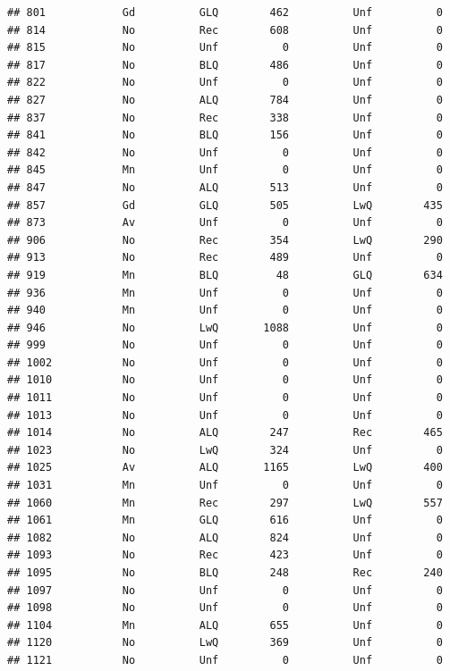 \documentclass[]{article}
\begin{document}
\begin{verbatim}
## 801            Gd          GLQ        462          Unf          0
## 814            No          Rec        608          Unf          0
## 815            No          Unf          0          Unf          0
## 817            No          BLQ        486          Unf          0
## 822            No          Unf          0          Unf          0
## 827            No          ALQ        784          Unf          0
## 837            No          Rec        338          Unf          0
## 841            No          BLQ        156          Unf          0
## 842            No          Unf          0          Unf          0
## 845            Mn          Unf          0          Unf          0
## 847            No          ALQ        513          Unf          0
## 857            Gd          GLQ        505          LwQ        435
## 873            Av          Unf          0          Unf          0
## 906            No          Rec        354          LwQ        290
## 913            No          Rec        489          Unf          0
## 919            Mn          BLQ         48          GLQ        634
## 936            Mn          Unf          0          Unf          0
## 940            Mn          Unf          0          Unf          0
## 946            No          LwQ       1088          Unf          0
## 999            No          Unf          0          Unf          0
## 1002           No          Unf          0          Unf          0
## 1010           No          Unf          0          Unf          0
## 1011           No          Unf          0          Unf          0
## 1013           No          Unf          0          Unf          0
## 1014           No          ALQ        247          Rec        465
## 1023           No          LwQ        324          Unf          0
## 1025           Av          ALQ       1165          LwQ        400
## 1031           Mn          Unf          0          Unf          0
## 1060           Mn          Rec        297          LwQ        557
## 1061           Mn          GLQ        616          Unf          0
## 1082           No          ALQ        824          Unf          0
## 1093           No          Rec        423          Unf          0
## 1095           No          BLQ        248          Rec        240
## 1097           No          Unf          0          Unf          0
## 1098           No          Unf          0          Unf          0
## 1104           Mn          ALQ        655          Unf          0
## 1120           No          LwQ        369          Unf          0
## 1121           No          Unf          0          Unf          0

\end{verbatim}
\end{document}
